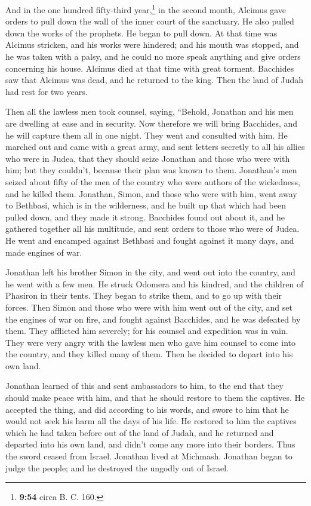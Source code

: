  And in the one hundred fifty-third year,\footnote{\textbf{9:54}
  circa B. C. 160.} in the second month, Alcimus gave orders to pull
down the wall of the inner court of the sanctuary. He also pulled down
the works of the prophets.  He began to pull down. At
that time was Alcimus stricken, and his works were hindered; and his
mouth was stopped, and he was taken with a palsy, and he could no more
speak anything and give orders concerning his house. 
Alcimus died at that time with great torment.  Bacchides
saw that Alcimus was dead, and he returned to the king. Then the land of
Judah had rest for two years.

 Then all the lawless men took counsel, saying, ``Behold,
Jonathan and his men are dwelling at ease and in security. Now therefore
we will bring Bacchides, and he will capture them all in one night.
 They went and consulted with him.  He
marched out and came with a great army, and sent letters secretly to all
his allies who were in Judea, that they should seize Jonathan and those
who were with him; but they couldn't, because their plan was known to
them.  Jonathan's men seized about fifty of the men of
the country who were authors of the wickedness, and he killed them.
 Jonathan, Simon, and those who were with him, went away
to Bethbasi, which is in the wilderness, and he built up that which had
been pulled down, and they made it strong.  Bacchides
found out about it, and he gathered together all his multitude, and sent
orders to those who were of Judea.  He went and encamped
against Bethbasi and fought against it many days, and made engines of
war.

 Jonathan left his brother Simon in the city, and went
out into the country, and he went with a few men.  He
struck Odomera and his kindred, and the children of Phasiron in their
tents.  They began to strike them, and to go up with
their forces. Then Simon and those who were with him went out of the
city, and set the engines of war on fire,  and fought
against Bacchides, and he was defeated by them. They afflicted him
severely; for his counsel and expedition was in vain. 
They were very angry with the lawless men who gave him counsel to come
into the country, and they killed many of them. Then he decided to
depart into his own land.

 Jonathan learned of this and sent ambassadors to him, to
the end that they should make peace with him, and that he should restore
to them the captives.  He accepted the thing, and did
according to his words, and swore to him that he would not seek his harm
all the days of his life.  He restored to him the
captives which he had taken before out of the land of Judah, and he
returned and departed into his own land, and didn't come any more into
their borders.  Thus the sword ceased from Israel.
Jonathan lived at Michmash. Jonathan began to judge the people; and he
destroyed the ungodly out of Israel.

